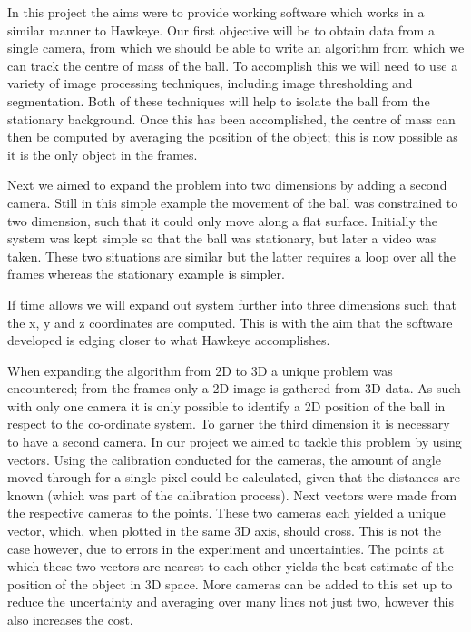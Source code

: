 \documentclass{article}
\begin{document}
In this project the aims were to provide working software which works in a similar manner to Hawkeye. Our first objective will be to obtain data from a single camera, from which we should be able to write an algorithm from which we can track the centre of mass of the ball. To accomplish this we will need to use a variety of image processing techniques, including image thresholding and segmentation. Both of these techniques will help to isolate the ball from the stationary background. Once this has been accomplished, the centre of mass can then be computed by averaging the position of the object; this is now possible as it is the only object in the frames. 

Next we aimed to expand the problem into two dimensions by adding a second camera. Still in this simple example the movement of the ball was constrained to two dimension, such that it could only move along a flat surface. Initially the system was kept simple so that the ball was stationary, but later a video was taken. These two situations are similar but the latter requires a loop over all the frames whereas the stationary example is simpler. 

If time allows we will expand out system further into three dimensions such that the x, y and z coordinates are computed. This is with the aim that the software developed is edging closer to what Hawkeye accomplishes. 

When expanding the algorithm from 2D to 3D a unique problem was encountered; from the frames only a 2D image is gathered from 3D data. As such with only one camera it is only possible to identify a 2D position of the ball in respect to the co-ordinate system. To garner the third dimension it is necessary to have a second camera. In our project we aimed to tackle this problem by using vectors. Using the calibration conducted for the cameras, the amount of angle moved through for a single pixel could be calculated, given that the distances are known (which was part of the calibration process). Next vectors were made from the respective cameras to the points. These two cameras each yielded a unique vector, which, when plotted in the same 3D axis, should cross. This is not the case however, due to errors in the experiment and uncertainties. The points at which these two vectors are nearest to each other yields the best estimate of the position of the object in 3D space. More cameras can be added to this set up to reduce the uncertainty and averaging over many lines not just two, however this also increases the cost.
\end{document}
